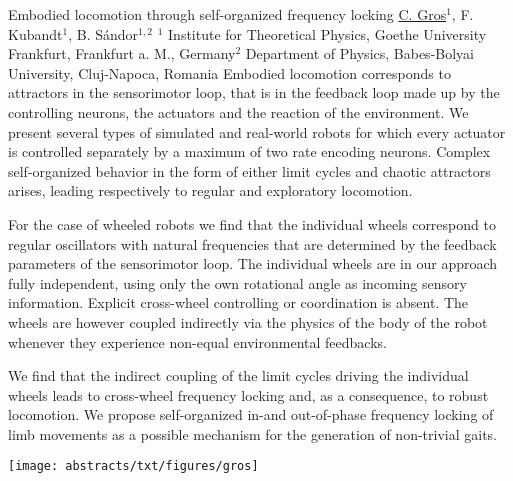 
    \begin{abstract_online}{Embodied locomotion through self-organized frequency locking}{%
        \underline{C. Gros}$^{1}$, F. Kubandt$^{1}$, B. S\'andor$^{1,2}$}{%
        }{%
        $^1$ Institute for Theoretical Physics, Goethe University Frankfurt, Frankfurt a. M., Germany\newline{}$^2$ Department of Physics, Babes-Bolyai University, Cluj-Napoca, Romania}
    Embodied locomotion corresponds to attractors in the sensorimotor loop, that is in the feedback  loop made up by the controlling neurons, the actuators and the reaction of the environment. We  present several types of simulated and real-world robots for which every actuator is controlled  separately by a maximum of two rate encoding neurons. Complex self-organized behavior in the form  of either limit cycles and chaotic attractors arises, leading respectively to regular and exploratory locomotion.  \par  For the case of wheeled robots we find that the individual wheels correspond to regular oscillators  with natural frequencies that are determined by the feedback parameters of the sensorimotor loop.  The individual wheels are in our approach fully independent, using only the own rotational angle as  incoming sensory information. Explicit cross-wheel controlling or coordination is absent. The wheels  are however coupled indirectly via the physics of the body of the robot whenever they experience  non-equal environmental feedbacks.  \par  We find that the indirect coupling of the limit cycles driving the individual wheels leads to cross-wheel frequency locking and, as a consequence, to robust locomotion. We propose self-organized in-and out-of-phase frequency locking of limb movements as a possible mechanism for the generation  of non-trivial gaits.  \par  \begin{center}  \texttt{[image: abstracts/txt/figures/gros]}  \end{center}  \vspace{-0.5cm}    
    
    \end{abstract_online}
    